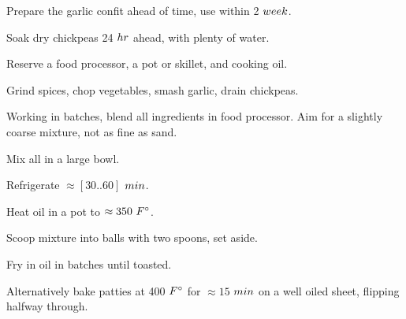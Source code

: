 \begin{preparation}
\item Prepare the garlic confit ahead of time, use within 2 $\week$.

\item Soak dry chickpeas 24 $\hour$ ahead, with plenty of water.

\item Reserve a food processor, a pot or skillet, and cooking oil.

\item Grind spices, chop vegetables, smash garlic, drain chickpeas.


\item Working in batches, blend all ingredients in food processor.
    Aim for a slightly coarse mixture, not as fine as sand.

\item Mix all in a large bowl.

\item Refrigerate $\approx [30 .. 60]$ $\minute$.

\item Heat oil in a pot to $\approx 350~\Fahrenheit$.

\item Scoop mixture into balls with two spoons, set aside.

\item Fry in oil in batches until toasted.

\end{preparation}

\begin{variation}
\item Alternatively bake patties at 400 $\Fahrenheit$ for $\approx 15$ $\minute$ on a
    well oiled sheet, flipping halfway through.

\end{variation}

\recipeend%
